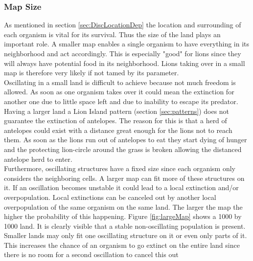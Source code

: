 \documentclass[11pt]{article}
\begin{document}
\subsubsection{Map Size}
\label{sec:DiscMapSize}
As mentioned in section \ref{sec:DiscLocationDep} the location and surrounding of each organism is vital for its survival. Thus the size of the land plays an important role. A smaller map enables a single organism to have everything in its neighborhood and act accordingly. This is especially "good" for lions since they will always have potential food in its neighborhood. Lions taking over in a small map is therefore very likely if not tamed by its parameter.\\
Oscillating in a small land is difficult to achieve because not much freedom is allowed. As soon as one organism takes over it could mean the extinction for another one due to little space left and due to inability to escape its predator.\\
Having a larger land a Lion Island pattern (section \ref{sec:patterns}) does not guarantee the extinction of antelopes. The reason for this is that a herd of antelopes could exist with a distance great enough for the lions not to reach them. As soon as the lions run out of antelopes to eat they start dying of hunger and the protecting lion-circle around the grass is broken allowing the distanced antelope herd to enter.\\
Furthermore, oscillating structures have a fixed size since each organism only considers the neighboring cells. A larger map can fit more of these structures on it. If an oscillation becomes unstable it could lead to a local extinction and/or overpopulation. Local extinctions can be canceled out by another local overpopulation of the same organism on the same land. The larger the map the higher the probability of this happening.  Figure \ref{fig:largeMap} shows a 1000 by 1000 land. It is clearly visible that a stable non-oscillating population is present. Smaller lands may only fit one oscillating structure on it or even only parts of it. This increases the chance of an organism to go extinct on the entire land since there is no room for a second oscillation to cancel this out\\
\end{document}
